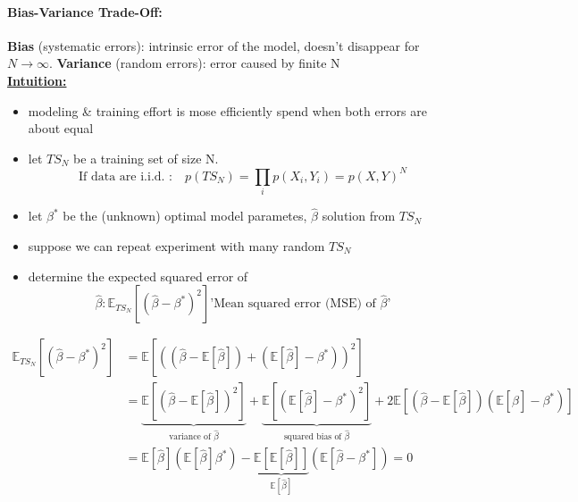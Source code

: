 \documentclass[11pt]{article}
\begin{document}
\begin{itemize}
    \paragraph{Bias-Variance Trade-Off:} \textbf{Bias} (systematic errors): intrinsic error of
    the model, doesn't disappear for $N \to \infty$. \textbf{Variance} (random errors):
    error caused by finite N \\
    \underline{\textbf{Intuition:}} \begin{itemize}
      \item modeling & training effort is mose efficiently spend when both
      errors are about equal
      \item let $TS_N$ be a training set of size N.
      \begin{equation*}
        \text{If data are i.i.d. :} \quad p(TS_N) = \prod_i p(X_i, Y_i)=p(X,Y)^N
      \end{equation*}
      \item let $\beta^*$ be the (unknown) optimal model parametes, $\hat{\beta}$
      solution from $TS_N$
      \item suppose we can repeat experiment with many random $TS_N$
      \item determine the expected squared error of
      \begin{equation*}
        \hat{\beta}: \mathbb{E}_{TS_N} [(\hat{\beta}-\beta^*)^2] \text{'Mean
        squared error (MSE) of $\hat{\beta}$'}
      \end{equation*}
    \end{itemize}
    \begin{equation*}
      \begin{align*}
        \mathbb{E}_{TS_N}[(\hat{\beta}-\beta^*)^2] &= \mathbb{E}[((\hat{\beta}-\mathbb{E}
        [\hat{\beta}])+(\mathbb{E}[\hat{\beta}]-\beta^*))^2] \\
        &= \underbrace{\mathbb{E}[(\hat{\beta}-\mathbb{E}[\hat{\beta}])^2]}_{
        \text{variance of $\hat{\beta}$}}+\underbrace{\mathbb{E}[(\mathbb{E}[\hat{\beta}]-\beta^*)^2]}_{
        \text{squared bias of $\hat{\beta}$}} + 2\mathbb{E}[(\hat{\beta}-\mathbb{E}
        [\hat{\beta}])(\mathbb{E}[\hat{\beta}]-\beta^*)] \\
        &= \mathbb{E}[\hat{\beta}](\mathbb{E}[\hat{\beta}]\beta^*)-\underbrace
        {\mathbb{E}[\mathbb{E}[\hat{\beta}]]}_{\mathbb{E}[\hat{\beta}]}(\mathbb
        {E}[\hat{\beta}-\beta^*]) = 0
      \end{align*}
    \end{equation*}

\end{itemize}
\end{document}
